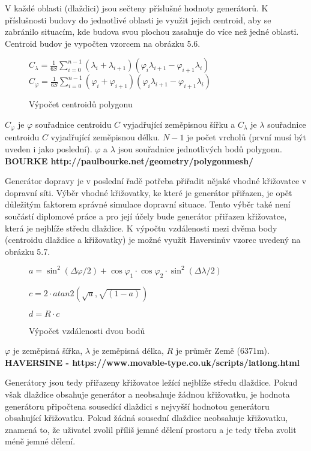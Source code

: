 V každé oblasti (dlaždici) jsou sečteny příslušné hodnoty generátorů. K příslušnosti budovy do jednotlivé oblasti je využit jejich centroid, aby se zabránilo situacím, kde budova svou plochou zasahuje do více než jedné oblasti. Centroid budov je vypočten vzorcem na obrázku 5.6.

\begin{figure}[htbp]
  \centering
  $\displaystyle C_{\lambda} = \frac{1}{6S}\sum_{i=0}^{n-1}(\lambda_{i}+\lambda_{i+1})(\varphi_{i}\lambda_{i+1}-\varphi_{i+1}\lambda_{i})$
  $\displaystyle C_{\varphi} = \frac{1}{6S}\sum_{i=0}^{n-1}(\varphi_{i}+\varphi_{i+1})(\varphi_{i}\lambda_{i+1}-\varphi_{i+1}\lambda_{i})$
  \caption{Výpočet centroidů polygonu}
  \label{centroid_polygonu}
\end{figure}

$C_\varphi$ je $\varphi$ souřadnice centroidu $C$ vyjadřující zeměpisnou šířku a $C_\lambda$ je $\lambda$ souřadnice centroidu $C$ vyjadřující zeměpisnou délku. $N-1$ je počet vrcholů (první musí být uveden i jako poslední). $\varphi$ a $\lambda$ jsou souřadnice jednotlivých bodů polygonu. 
\textbf{BOURKE \- http://paulbourke.net/geometry/polygonmesh/}

Generátor dopravy je v poslední řadě potřeba přiřadit nějaké vhodné křižovatce v dopravní síti. Výběr vhodné křižovatky, ke které je generátor přiřazen, je opět důležitým faktorem správné simulace dopravní situace. Tento výběr také není součástí diplomové práce a pro její účely bude generátor přiřazen křižovatce, která je nejblíže středu dlaždice. K výpočtu vzdálenosti mezi dvěma body (centroidu dlaždice a křižovatky) je možné využít Haversinův vzorec uvedený na obrázku 5.7.


\begin{figure}[htbp]
  \centering
  $\displaystyle a = \sin ^{2}(\Delta \varphi /2)+\cos \varphi_{1} \cdot \cos \varphi_{2} \cdot \sin^{2}(\Delta\lambda/2)$

  
  $\displaystyle c = 2\cdot  atan2 (\sqrt{a}, \sqrt{(1-a)})$


  $\displaystyle d = R\cdot c$
  \caption{Výpočet vzdálenosti dvou bodů}
\end{figure}

$\varphi$ je zeměpisná šířka, $\lambda$ je zeměpisná délka, $R$ je průměr Země (6371m). \textbf{HAVERSINE - https://www.movable-type.co.uk/scripts/latlong.html}

Generátory jsou tedy přiřazeny křižovatce ležící nejblíže středu dlaždice. Pokud však dlaždice obsahuje generátor a neobsahuje žádnou křižovatku, je hodnota generátoru připočtena sousedící dlaždici s nejvyšší hodnotou generátoru obsahující křižovatku. Pokud žádná sousední dlaždice neobsahuje křižovatku, znamená to, že uživatel zvolil příliš jemné dělení prostoru a je tedy třeba zvolit méně jemné dělení. 

